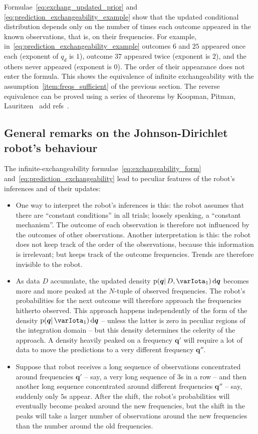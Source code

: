 \documentclass[\ifafour a4paper,12pt,\else a5paper,10pt,\fi%
onecolumn,oneside,article,%
british%
]{memoir}
\theoremstyle{remark}
\theoremstyle{innote}
\newcommand*{\di}{\mathrm{d}}%
\newcommand*{\pf}{\mathrm{p}}%
\renewcommand*{\|}{\mathpunct{|}}
\newcommand*{\puzzle}{\maltese}
\newcommand{\mynote}[1]{ {\color{notecolour}\puzzle\ #1\ }}
\newcommand*{\yqq}{q}
\newcommand*{\yq}{\bm{\yqq}}
\newcommand*{\yI}{\varIota}
\newcommand*{\yMJ}{\yI_1}
\begin{document}
Formulae~\eqref{eq:exchang_updated_prior} and
\eqref{eq:prediction_exchangeability_example} show that the updated
conditional distribution depends only on the number of times each outcome
appeared in the known observations, that is, on their frequencies. For
example, in~\eqref{eq:prediction_exchangeability_example} outcomes $6$ and
$25$ appeared once each (exponent of $\yqq_d$ is $1$), outcome $37$
appeared twice (exponent is $2$), and the others never appeared (exponent
is $0$). The order of their appearance does not enter the formula. This
shows the equivalence of infinite exchangeability with the
assumption~\ref{item:freqs_sufficient} of the previous section. The reverse
equivalence can be proved using a series of theorems by Koopman, Pitman,
Lauritzen\mynote{add refs}. \textcolor{white}{If you find this you can
  claim a postcard from me.}
%



\subsection{General remarks on the Johnson-Dirichlet robot's behaviour}
\label{sec:remarks}

The infinite-exchangeability formulae~\eqref{eq:exchangeability_form}
and~\eqref{eq:prediction_exchangeability} lead to peculiar features of the
robot's inferences and of their updates:
\begin{itemize}
\item One way to interpret the robot's inferences is this: the robot
  assumes that there are \enquote{constant conditions} in all trials;
  loosely speaking, a \enquote{constant mechanism}. The outcome of each
  observation is therefore not influenced by the outcomes of other
  observations. Another interpretation is this: the robot does not keep
  track of the order of the observations, because this information is
  irrelevant; but keeps track of the outcome frequencies. Trends are
  therefore invisible to the robot.
\item As data $D$ accumulate, the updated density
  $\pf(\yq \| D, \yMJ)\,\di\yq$ becomes more and more peaked at the
  $N$-tuple of observed frequencies. The robot's probabilities for the next
  outcome will therefore approach the frequencies hitherto observed. This
  approach happens independently of the form of the density
  $\pf(\yq \| \yMJ)\,\di\yq$ -- unless the latter is zero in peculiar
  regions of the integration domain -- but this density determines the
  celerity of the approach. A density heavily peaked on a frequency $\yq'$
  will require a lot of data to move the predictions to a very different
  frequency $\yq''$.
\item Suppose that robot receives a long sequence of observations
  concentrated around frequencies $\yq'$ -- say, a very long sequence of
  $3$s in a row -- and then another long sequence concentrated around
  different frequencies $\yq''$ -- say, suddenly only $5$s appear. After
  the shift, the robot's probabilities will eventually become peaked around
  the new frequencies, but the shift in the peaks will take a larger number
  of observations around the new frequencies than the number around the old
  frequencies.
\end{itemize}
\end{document}
